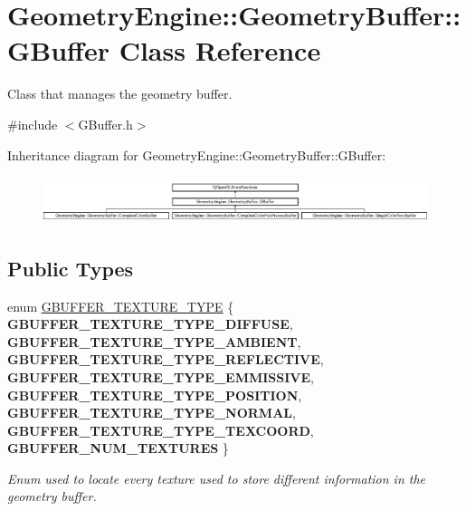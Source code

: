 \hypertarget{class_geometry_engine_1_1_geometry_buffer_1_1_g_buffer}{}\section{Geometry\+Engine\+::Geometry\+Buffer\+::G\+Buffer Class Reference}
\label{class_geometry_engine_1_1_geometry_buffer_1_1_g_buffer}


Class that manages the geometry buffer.  




{\ttfamily \#include $<$G\+Buffer.\+h$>$}

Inheritance diagram for Geometry\+Engine\+::Geometry\+Buffer\+::G\+Buffer\+:\begin{figure}[H]
\begin{center}
\leavevmode
\includegraphics[height=1.393035cm]{class_geometry_engine_1_1_geometry_buffer_1_1_g_buffer}
\end{center}
\end{figure}
\subsection*{Public Types}
\begin{DoxyCompactItemize}
\item 
\mbox{\label{class_geometry_engine_1_1_geometry_buffer_1_1_g_buffer_a718dceafcac1915f7de061108597e1cc}} 
enum \mbox{\hyperlink{class_geometry_engine_1_1_geometry_buffer_1_1_g_buffer_a718dceafcac1915f7de061108597e1cc}{G\+B\+U\+F\+F\+E\+R\+\_\+\+T\+E\+X\+T\+U\+R\+E\+\_\+\+T\+Y\+PE}} \{ \newline
{\bfseries G\+B\+U\+F\+F\+E\+R\+\_\+\+T\+E\+X\+T\+U\+R\+E\+\_\+\+T\+Y\+P\+E\+\_\+\+D\+I\+F\+F\+U\+SE}, 
{\bfseries G\+B\+U\+F\+F\+E\+R\+\_\+\+T\+E\+X\+T\+U\+R\+E\+\_\+\+T\+Y\+P\+E\+\_\+\+A\+M\+B\+I\+E\+NT}, 
{\bfseries G\+B\+U\+F\+F\+E\+R\+\_\+\+T\+E\+X\+T\+U\+R\+E\+\_\+\+T\+Y\+P\+E\+\_\+\+R\+E\+F\+L\+E\+C\+T\+I\+VE}, 
{\bfseries G\+B\+U\+F\+F\+E\+R\+\_\+\+T\+E\+X\+T\+U\+R\+E\+\_\+\+T\+Y\+P\+E\+\_\+\+E\+M\+M\+I\+S\+S\+I\+VE}, 
\newline
{\bfseries G\+B\+U\+F\+F\+E\+R\+\_\+\+T\+E\+X\+T\+U\+R\+E\+\_\+\+T\+Y\+P\+E\+\_\+\+P\+O\+S\+I\+T\+I\+ON}, 
{\bfseries G\+B\+U\+F\+F\+E\+R\+\_\+\+T\+E\+X\+T\+U\+R\+E\+\_\+\+T\+Y\+P\+E\+\_\+\+N\+O\+R\+M\+AL}, 
{\bfseries G\+B\+U\+F\+F\+E\+R\+\_\+\+T\+E\+X\+T\+U\+R\+E\+\_\+\+T\+Y\+P\+E\+\_\+\+T\+E\+X\+C\+O\+O\+RD}, 
{\bfseries G\+B\+U\+F\+F\+E\+R\+\_\+\+N\+U\+M\+\_\+\+T\+E\+X\+T\+U\+R\+ES}
 \}
\begin{DoxyCompactList}\small\item\em Enum used to locate every texture used to store different information in the geometry buffer. \end{DoxyCompactList}\end{DoxyCompactItemize}
